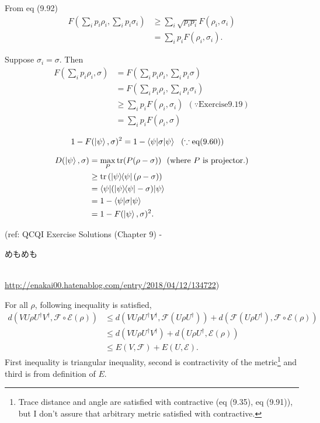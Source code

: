 From eq (9.92)
\begin{align*}
    F \left( \sum_i p_i \rho_i, \sum_i p_i \sigma_i \right) &\geq \sum_i \sqrt{p_i p_i} F(\rho_i, \sigma_i)\\
        &= \sum_i p_i F(\rho_i, \sigma_i).
\end{align*}


Suppose $\sigma_i = \sigma$. Then
\begin{align*}
    F \left( \sum_i p_i \rho_i, \sigma \right) &= F \left( \sum_i p_i \rho_i, \sum_i p_i \sigma \right) \\
        &= F \left( \sum_i p_i \rho_i, \sum_i p_i \sigma_i \right) \\
        &\geq \sum_i p_i F(\rho_i, \sigma_i)~~(\because \text{Exercise}  9.19)\\
        &= \sum_i p_i F(\rho_i, \sigma)
\end{align*}


\begin{align*}
    1 - F(\ket{\psi} ,\sigma)^2 &= 1 - \braket{\psi | \sigma | \psi} ~~(\because \text{eq} (9.60))
\end{align*}


\begin{align*}
    D(\ket{\psi}, \sigma) &= \max_P \operatorname{tr} (P (\rho - \sigma)) ~~(\text{where } P \text{ is projector.})\\
        &\geq \operatorname{tr} \left(\ket{\psi}\hspace{-1mm} \bra{\psi} (\rho - \sigma)\right)\\
        &= \braket{\psi | (\ket{\psi}\hspace{-1mm} \bra{\psi} - \sigma) | \psi}\\
        &= 1 - \braket{\psi | \sigma | \psi}\\
        &= 1 - F(\ket{\psi}, \sigma)^2.
\end{align*}

(ref: QCQI Exercise Solutions (Chapter 9) - \begin{CJK}{UTF8}{ipxm}めもめも\end{CJK} \\ \url{http://enakai00.hatenablog.com/entry/2018/04/12/134722})

For all $\rho$, following inequality is satisfied,
\begin{align*}
        d(VU \rho U^\dagger V^\dagger, \mathcal{F} \circ \mathcal{E}(\rho))
        &\leq d(VU \rho U^\dagger V^\dagger, \mathcal{F}(U\rho U^\dagger)) + d(\mathcal{F}(U\rho U^\dagger), \mathcal{F}\circ \mathcal{E}(\rho)) \\
        &\leq d(VU \rho U^\dagger V^\dagger) + d(U\rho U^\dagger, \mathcal{E}(\rho))\\
        &\leq E(V, \mathcal{F})+ E(U, \mathcal{E}).
\end{align*}
First inequality is triangular inequality, second is contractivity of the metric\footnote{Trace distance and angle are satisfied with contractive (eq (9.35), eq (9.91)), but I don't assure that arbitrary metric satisfied with contractive. }
and third is from definition of $E$.

